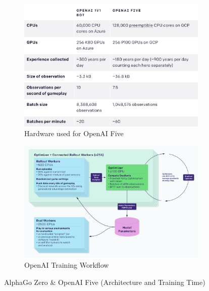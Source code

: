 \begin{figure}[!htb]
	\begin{subfigure}[b]{0.4\textwidth}
		\centering
		\includegraphics[width=1.1\textwidth]{figures/rl/openai_five_hardware.png}
		\caption{Hardware used for OpenAI Five}
		\label{fig:five_hardware}
	\end{subfigure}
	\hfill
	\begin{subfigure}[b]{0.4\textwidth}
		\centering
		\includegraphics[width=1.1\textwidth]{figures/rl/openai_five_training.png}
		\caption{OpenAI Training Workflow}
		\label{fig:openai_five_training}
	\end{subfigure}
	\hfill
	\caption[AlphaGo Zero \& OpenAI Five]{AlphaGo Zero \& OpenAI Five (Architecture and Training Time)\protect\footnotemark}
	\label{fig:zero_and_five}
\end{figure}


